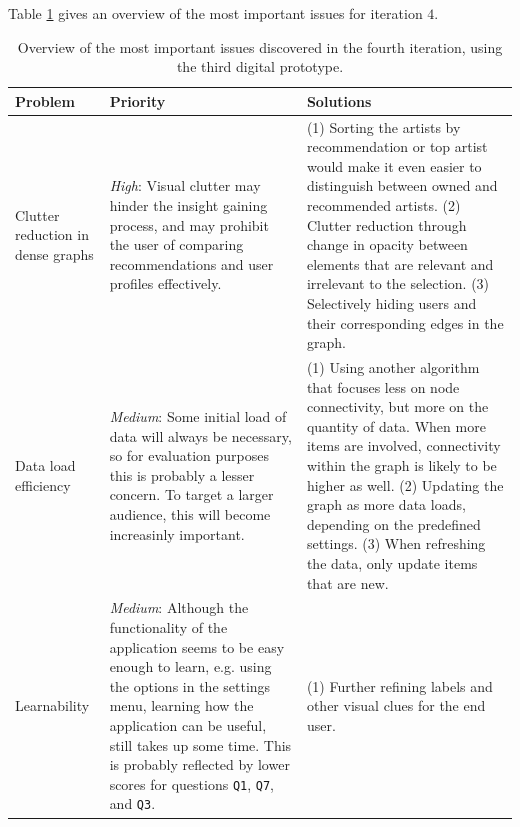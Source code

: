 Table \ref{table:iteration4:issues} gives an overview of the most important issues for iteration $4$.

\begin{table}
	\caption{Overview of the most important issues discovered in the fourth iteration, using the third digital prototype.}
	\begin{center}
		\begin{tabular}{p{70px} | p{180px} | p{180px} }
			\hline
			\textbf{Problem} & \textbf{Priority} & \textbf{Solutions} \\
			\hline
			
			Clutter reduction in dense graphs
			&
			\emph{High}: Visual clutter may hinder the insight gaining process, and may prohibit the user of comparing recommendations and user profiles effectively.
			&
			(1) Sorting the artists by recommendation or top artist would make it even easier to distinguish between owned and recommended artists. (2) Clutter reduction through change in opacity between elements that are relevant and irrelevant to the selection. (3) Selectively hiding users and their corresponding edges in the graph.
			\\
			
			Data load efficiency
			&
			\emph{Medium}: Some initial load of data will always be necessary, so for evaluation purposes this is probably a lesser concern.  To target a larger audience, this will become increasinly important.
			&
			(1) Using another algorithm that focuses less on node connectivity, but more on the quantity of data. When more items are involved, connectivity within the graph is likely to be higher as well. (2) Updating the graph as more data loads, depending on the predefined settings. (3) When refreshing the data, only update items that are new.
			\\
			
			Learnability
			&
			\emph{Medium}: Although the functionality of the application seems to be easy enough to learn, e.g. using the options in the settings menu, learning how the application can be useful, still takes up some time. This is probably reflected by lower scores for questions \texttt{Q1}, \texttt{Q7}, and \texttt{Q3}.
			&
			(1) Further refining labels and other visual clues for the end user.
			\\
			
			\hline
		\end{tabular}
	\end{center}
\label{table:iteration4:issues}
\end{table}
